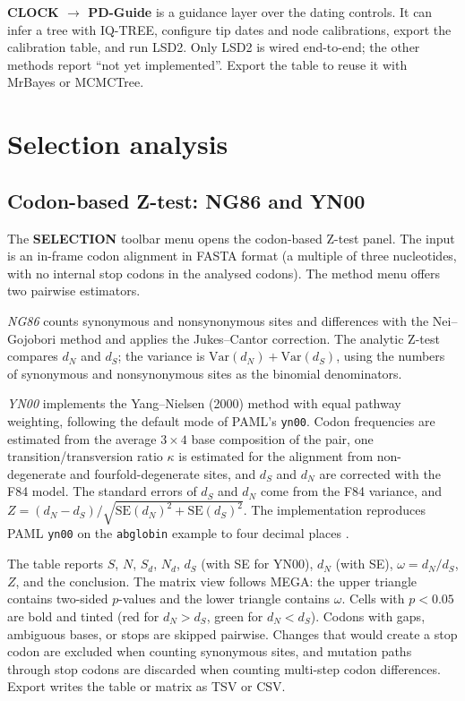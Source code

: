 \documentclass[10pt]{report}
\begin{document}
\textbf{CLOCK $\rightarrow$ PD-Guide} is a guidance layer over the dating
controls. It can infer a tree with IQ-TREE, configure tip dates and node
calibrations, export the calibration table, and run LSD2. Only LSD2 is wired
end-to-end; the other methods report ``not yet implemented''. Export the table
to reuse it with MrBayes or MCMCTree.

\chapter{Selection analysis}

\section{Codon-based Z-test: NG86 and YN00}

The \textbf{SELECTION} toolbar menu opens the codon-based Z-test panel. The
input is an in-frame codon alignment in FASTA format (a multiple of three
nucleotides, with no internal stop codons in the analysed codons). The method
menu offers two pairwise estimators.

\emph{NG86} counts synonymous and nonsynonymous sites and differences with the
Nei--Gojobori method and applies the Jukes--Cantor correction. The analytic
Z-test compares $d_N$ and $d_S$; the variance is
$\mathrm{Var}(d_N)+\mathrm{Var}(d_S)$, using the numbers of synonymous and
nonsynonymous sites as the binomial denominators.

\emph{YN00} implements the Yang--Nielsen (2000) method with equal pathway
weighting, following the default mode of PAML's \texttt{yn00}. Codon
frequencies are estimated from the average $3\times4$ base composition of the
pair, one transition/transversion ratio $\kappa$ is estimated for the alignment
from non-degenerate and fourfold-degenerate sites, and $d_S$ and $d_N$ are
corrected with the F84 model. The standard errors of $d_S$ and $d_N$ come from
the F84 variance, and
$Z=(d_N-d_S)/\sqrt{\mathrm{SE}(d_N)^2+\mathrm{SE}(d_S)^2}$. The implementation
reproduces PAML \texttt{yn00} on the \texttt{abglobin} example to four decimal
places \cite{paml}.

The table reports $S$, $N$, $S_d$, $N_d$, $d_S$ (with SE for YN00), $d_N$
(with SE), $\omega=d_N/d_S$, $Z$, and the conclusion. The matrix view follows
MEGA: the upper triangle contains two-sided $p$-values and the lower triangle
contains $\omega$. Cells with $p<0.05$ are bold and tinted (red for
$d_N>d_S$, green for $d_N<d_S$). Codons with gaps, ambiguous bases, or stops
are skipped pairwise. Changes that would create a stop codon are excluded when
counting synonymous sites, and mutation paths through stop codons are discarded
when counting multi-step codon differences. Export writes the table or matrix
as TSV or CSV.
\end{document}
